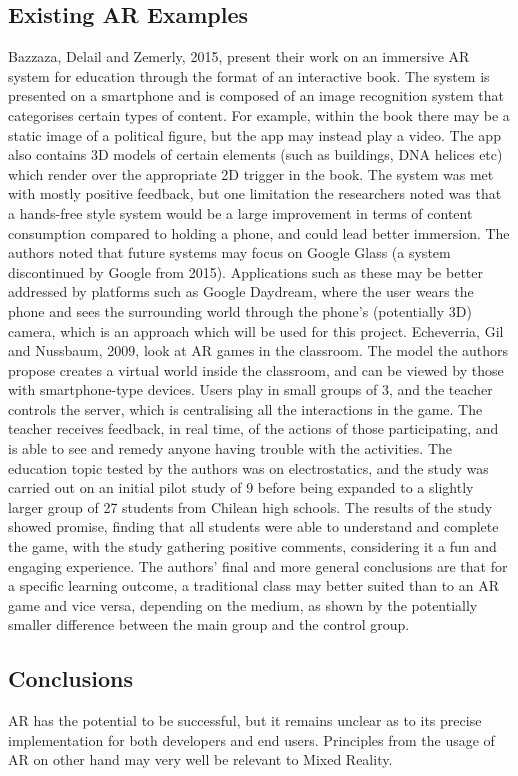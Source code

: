 \documentclass[11pt]{report}
\begin{document}
\subsection{Existing AR Examples}
Bazzaza, Delail and Zemerly, 2015, present their work on an immersive AR system for education through the format of an interactive book. The system is presented on a smartphone and is composed of an image recognition system that categorises certain types of content. For example, within the book there may be a static image of a political figure, but the app may instead play a video. The app also contains 3D models of certain elements (such as buildings, DNA helices etc) which render over the appropriate 2D trigger in the book. The system was met with mostly positive feedback, but one limitation the researchers noted was that a hands-free style system would be a large improvement in terms of content consumption compared to holding a phone, and could lead better immersion. The authors noted that future systems may focus on Google Glass (a system discontinued by Google from 2015). Applications such as these may be better addressed by platforms such as Google Daydream, where the user wears the phone and sees the surrounding world through the phone's (potentially 3D) camera, which is an approach which will be used for this project. Echeverria, Gil and Nussbaum, 2009, look at AR games in the classroom. The model the authors propose creates a virtual world inside the classroom, and can be viewed by those with smartphone-type devices. Users play in small groups of 3, and the teacher controls the server, which is centralising all the interactions in the game. The teacher receives feedback, in real time, of the actions of those participating, and is able to see and remedy anyone having trouble with the activities. The education topic tested by the authors was on electrostatics, and the study was carried out on an initial pilot study of 9 before being expanded to a slightly larger group of 27 students from Chilean high schools. The results of the study showed promise, finding that all students were able to understand and complete the game, with the study gathering positive comments, considering it a fun and engaging experience. The authors' final and more general conclusions are that for a specific learning outcome, a traditional class may better suited than to an AR game and vice versa, depending on the medium, as shown by the potentially smaller difference between the main group and the control group.
\subsection{Conclusions}
AR has the potential to be successful, but it remains unclear as to its precise implementation for both developers and end users. Principles from the usage of AR on other hand may very well be relevant to Mixed Reality.
\end{document}
